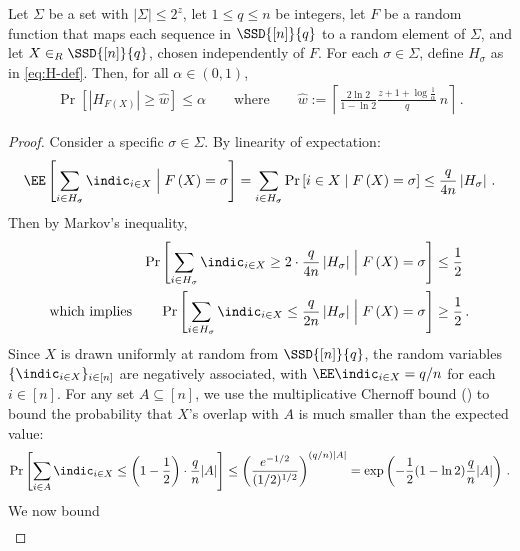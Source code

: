 \begin{itemize}
\begin{itemize}
\begin{lemma}\label{lem:forward-avoid}
  Let $\Sigma$ be a set with $|\Sigma| \le 2^z$, let $1 \le q \le n$ be
  integers, let $F$ be a random function that maps each sequence in
  $\SSD{[n]}{q}$ to a random element of $\Sigma$, and let $X \in_R
  \SSD{[n]}{q}$, chosen independently of $F$. For each $\sigma\in\Sigma$,
  define $H_\sigma$ as in \cref{eq:H-def}. Then, for all
  $\alpha\in\left(0,1\right)$,
  \begin{align*}
    \Pr\left[\left|H_{F(X)}\right|\ge\hat{w}\right] \le \alpha
    \qquad\text{where}\qquad
    \hat{w} := \left\lceil \frac{2\ln2}{1-\ln2} \frac{z+1+\log\frac{1}{\alpha}}{q}\, n\right\rceil \,.
  \end{align*}
\end{lemma}
%
\begin{proof}%
   Consider a specific $\sigma\in\Sigma$. By linearity of expectation:
  \begin{align*}
    \EE\left[\sum_{i\in H_{\sigma}}\indic_{i \in X}\Bigm| F\left(X\right)=\sigma\right]=\sum_{i\in H_{\sigma}}\Pr\left[i\in X\mid F\left(X\right)=\sigma\right]\le\frac{q}{4n}\left|H_{\sigma}\right| \,.
  \end{align*}
  Then by Markov's inequality,
  \begin{align*}
    \Pr\left[\sum_{i\in H_{\sigma}}\indic_{i \in X}\ge2\cdot\frac{q}{4n}\left|H_{\sigma}\right|\Bigm| F\left(X\right)=\sigma\right]
      &\le \frac{1}{2} \\
      \text{which implies}\qquad
      \Pr\left[\sum_{i\in H_{\sigma}}\indic_{i \in X}\le\frac{q}{2n}\left|H_{\sigma}\right|\Bigm| F\left(X\right)=\sigma\right]
        &\ge \frac{1}{2} \,.
  \end{align*}
  Since $X$ is drawn uniformly at random from $\SSD{[n]}{q}$, the random
  variables $\{\indic_{i \in X}\}_{i \in [n]}$ are negatively associated, with
  $\EE \indic_{i \in X} = q/n$ for each $i \in [n]$. For any set $A
  \subseteq [n]$, we use the multiplicative Chernoff bound
  () to bound the probability that $X$'s overlap
  with $A$ is much smaller than the expected value:
  \begin{align*}
    \Pr\left[\sum_{i\in A}\indic_{i \in X}\le\left(1-\frac{1}{2}\right)\cdot\frac{q}{n}|A|\right]
      \le\left(\frac{e^{-1/2}}{(1/2)^{1/2}}\right)^{(q/n)|A|}
      =\exp\left(-\frac{1}{2}(1-\ln 2)\frac{q}{n}|A|\right) \,.
  \end{align*}
  We now bound
  \begin{align*}

\end{align*}
\end{proof}
\end{itemize}
\end{itemize}
